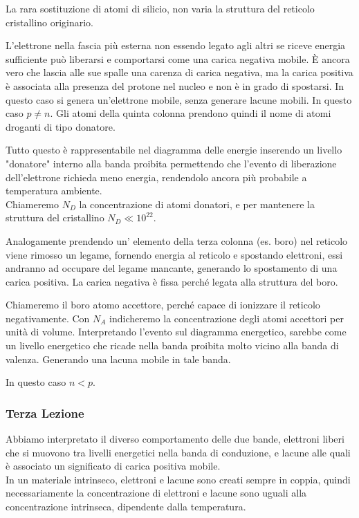 \documentclass[../template]{subfiles}
\begin{document}
La rara sostituzione di atomi di silicio, non varia la struttura del reticolo cristallino originario.

L'elettrone nella fascia più esterna non essendo legato agli altri se riceve energia sufficiente può liberarsi e comportarsi come una carica negativa mobile. È ancora vero che lascia alle sue spalle una carenza di carica negativa, ma la carica positiva è associata alla presenza del protone nel nucleo e non è in grado di spostarsi.
In questo caso si genera un'elettrone mobile, senza generare lacune mobili. In questo caso $p \neq n$. Gli atomi della quinta colonna prendono quindi il nome di atomi droganti di tipo donatore.

Tutto questo è rappresentabile nel diagramma delle energie inserendo un livello "donatore" interno alla banda proibita permettendo che l'evento di liberazione dell'elettrone richieda meno energia, rendendolo ancora più probabile a temperatura ambiente.
\\
Chiameremo $N_D$ la concentrazione di atomi donatori, e per mantenere la struttura del cristallino $N_D \ll 10^{22}$.

Analogamente prendendo un' elemento della terza colonna (es. boro) nel reticolo viene rimosso un legame, fornendo energia al reticolo e spostando elettroni, essi andranno ad occupare del legame mancante, generando lo spostamento di una carica positiva.
La carica negativa è fissa perché legata alla struttura del boro.

Chiameremo il boro atomo accettore, perché capace di ionizzare il reticolo negativamente. Con $N_A$ indicheremo la concentrazione degli atomi accettori per unità di volume. Interpretando l'evento sul diagramma energetico, sarebbe come un livello energetico che ricade nella banda proibita molto vicino alla banda di valenza. Generando una lacuna mobile in tale banda.

In questo caso $n < p$.

\subsubsection{Terza Lezione}
Abbiamo interpretato il diverso comportamento delle due bande, elettroni liberi che si muovono tra livelli energetici nella banda di conduzione, e lacune alle quali è associato un significato di carica positiva mobile.
\\
In un materiale intrinseco, elettroni e lacune sono creati sempre in coppia, quindi necessariamente la concentrazione di elettroni e lacune sono uguali alla concentrazione intrinseca, dipendente dalla temperatura.
\end{document}
